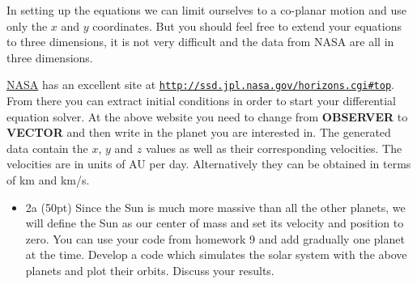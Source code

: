 \documentclass[%
oneside,                 %
final,                   %
10pt]{article}
\begin{document}
In setting up the equations we can limit ourselves to a co-planar motion and use only the $x$ and $y$ coordinates. But you should feel free to extend your equations to three dimensions, it is not very difficult and the data from NASA are all in three dimensions.

\href{{http://www.nasa.gov/index.html}}{NASA} has an excellent site at \href{{http://ssd.jpl.nasa.gov/horizons.cgi#top}}{\nolinkurl{http://ssd.jpl.nasa.gov/horizons.cgi\#top}}.
From there you can extract initial conditions in order to start your differential equation solver.
At the above website you need to change from \textbf{OBSERVER} to \textbf{VECTOR} and then write in the planet you are interested in.
The generated data contain the $x$, $y$ and $z$ values as well as their corresponding velocities. The velocities are in units of AU per day.
Alternatively they can be obtained in terms of km and km/s. 


\begin{itemize}
\item 2a (50pt) Since the Sun is much more massive than all the other planets, we will define the Sun as our center of mass and set its velocity and position to zero. You can use your code from homework 9 and add gradually one planet at the time. Develop a code which simulates the solar system with the above planets and plot their orbits. Discuss your results.
\end{itemize}

\noindent


\end{document}
